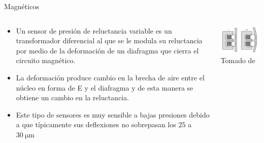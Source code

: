 \documentclass[aspectratio=169]{beamer}
\begin{document}
\begin{frame}{Magnéticos}
    \begin{columns}[c, onlytextwidth]
        \begin{column}{0.6\textwidth}
            \begin{itemize}
                \item Un sensor de presión de reluctancia variable es un transformador diferencial al que se le modula su reluctancia por medio de la deformación de un diafragma que cierra el circuito magnético. 
                \item La deformación produce cambio en la brecha de aire entre el núcleo en forma de E y el diafragma y de esta manera se obtiene un cambio en la reluctancia. 
                \item Este tipo de sensores es muy sensible a bajas presiones debido a que típicamente sus deflexiones no sobrepasan los $25$ a $\SI{30}{\micro\meter}$ 
            \end{itemize}
        \end{column}
        \begin{column}{0.4\textwidth}
            \centering
            \includegraphics[width=6cm]{fig/Presion/VRP.PNG}
             \\ \tiny{Tomado de \cite{pallas2012sensors}}
        \end{column}
    \end{columns}
\end{frame}
\end{document}
